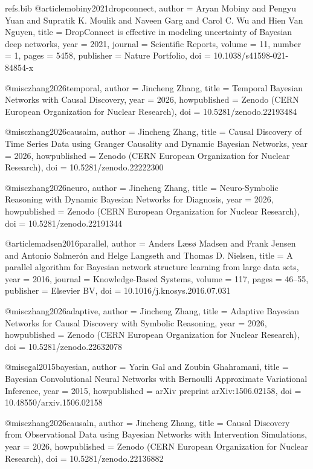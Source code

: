\begin{filecontents*}[overwrite]{refs.bib}
@article{mobiny2021dropconnect,
  author = {Aryan Mobiny and Pengyu Yuan and Supratik K. Moulik and Naveen Garg and Carol C. Wu and Hien Van Nguyen},
  title = {{DropConnect is effective in modeling uncertainty of Bayesian deep networks}},
  year = {2021},
  journal = {Scientific Reports},
  volume = {11},
  number = {1},
  pages = {5458},
  publisher = {Nature Portfolio},
  doi = {10.1038/s41598-021-84854-x}
}

@misc{zhang2026temporal,
  author = {Jincheng Zhang},
  title = {{Temporal Bayesian Networks with Causal Discovery}},
  year = {2026},
  howpublished = {Zenodo (CERN European Organization for Nuclear Research)},
  doi = {10.5281/zenodo.22193484}
}

@misc{zhang2026causalm,
  author = {Jincheng Zhang},
  title = {{Causal Discovery of Time Series Data using Granger Causality and Dynamic Bayesian Networks}},
  year = {2026},
  howpublished = {Zenodo (CERN European Organization for Nuclear Research)},
  doi = {10.5281/zenodo.22222300}
}

@misc{zhang2026neuro,
  author = {Jincheng Zhang},
  title = {{Neuro-Symbolic Reasoning with Dynamic Bayesian Networks for Diagnosis}},
  year = {2026},
  howpublished = {Zenodo (CERN European Organization for Nuclear Research)},
  doi = {10.5281/zenodo.22191344}
}

@article{madsen2016parallel,
  author = {Anders L{\ae}s{\o} Madsen and Frank Jensen and Antonio Salmer{\'o}n and Helge Langseth and Thomas D. Nielsen},
  title = {{A parallel algorithm for Bayesian network structure learning from large data sets}},
  year = {2016},
  journal = {Knowledge-Based Systems},
  volume = {117},
  pages = {46--55},
  publisher = {Elsevier BV},
  doi = {10.1016/j.knosys.2016.07.031}
}

@misc{zhang2026adaptive,
  author = {Jincheng Zhang},
  title = {{Adaptive Bayesian Networks for Causal Discovery with Symbolic Reasoning}},
  year = {2026},
  howpublished = {Zenodo (CERN European Organization for Nuclear Research)},
  doi = {10.5281/zenodo.22632078}
}

@misc{gal2015bayesian,
  author = {Yarin Gal and Zoubin Ghahramani},
  title = {{Bayesian Convolutional Neural Networks with Bernoulli Approximate Variational Inference}},
  year = {2015},
  howpublished = {arXiv preprint arXiv:1506.02158},
  doi = {10.48550/arxiv.1506.02158}
}

@misc{zhang2026causaln,
  author = {Jincheng Zhang},
  title = {{Causal Discovery from Observational Data using Bayesian Networks with Intervention Simulations}},
  year = {2026},
  howpublished = {Zenodo (CERN European Organization for Nuclear Research)},
  doi = {10.5281/zenodo.22136882}
}


\end{filecontents*}
